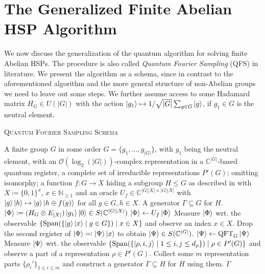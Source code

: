 \documentclass[10pt]{amsart}
\theoremstyle{definition}
\theoremstyle{remark}
\DeclareMathOperator{\Span}{Span}
\newcommand{\onot}{\mathcal{O}}
\begin{document}
    \section{The Generalized Finite Abelian HSP Algorithm} \phantom{}

    We now discuss the generalization of the quantum algorithm for solving finite Abelian HSPs. The procedure is also called \emph{Quantum Fourier Sampling} (QFS) in literature. We present the algorithm as a schema, since in contrast to the aforementioned algorithm and the more general structure of non-Abelian groups we need to leave out some steps. We further assume access to some Hadamard matrix \(H_G \in U(|G|)\) with the action \(\ket{g_1} \mapsto 1/\sqrt{|G|} \sum_{g \in G} \ket{g}\), if \(g_1 \in G\) is the neutral element.

    {\centering\begin{minipage}{\linewidth}
        \vspace{-0.25cm}
        \begin{algorithm}[H]
            \caption{\textsc{Quantum Fourier Sampling Schema}}
            \label{quantum_fourier_sampling_schema}
            \begin{algorithmic}[1]
                \Require A finite group \(G\) in some order \(G = \{g_1, ..., g_{|G|}\}\), with \(g_1\) being the neutral element, with an \(\onot(\log_2(|G|))\)-complex representation in a \(\mathbb{C}^{|G|}\)-based quantum register, a complete set of irreducible representations \(P'(G)\); omitting isomorphy; a function \(f\colon G \to X\) hiding a subgroup \(H \leq G\) as described in  with \(X \coloneqq \{0, 1\}^x\), \(x \in \mathbb{N}_{\geq 1}\) and an oracle \(U_f \in \mathbb{C}^{|G||X| \times |G||X|}\) with \(\ket{g}\ket{h} \mapsto \ket{g}\ket{h \oplus f(g)}\) for all \(g \in G, h \in X\).
                \Ensure A generator \(\Gamma \subseteq G\) for \(H\).
                \State \(\ket{\Phi} \coloneqq (H_G \otimes E_{|X|}) \ket{g_1}\ket{0} \in S(\mathbb{C}^{|G||X|})\) \label{quantum_fourier_sampling_schema_step_1}
                \State \(\ket{\Phi} \gets U_f \ket{\Phi}\) \label{quantum_fourier_sampling_schema_step_2}
                \State Measure \(\ket{\Phi}\) wrt. the observable \(\{\Span(\{\ket{g}\ket{x} \mid g \in G\}) \mid x \in X\}\) and observe an index \(x \in X\).
                \State Drop the second register of \(\ket{\Phi} \eqqcolon \ket{\Psi}\ket{x}\) to obtain \(\ket{\Psi} \in S(\mathbb{C}^{|G|})\).
                \State \(\ket{\Psi} \gets \text{QFT}_G \ket{\Psi}\)
                \State Measure \(\ket{\Psi}\) wrt. the observable \(\{\Span(\{\ket{\rho, i, j} \mid 1 \leq i, j \leq d_\rho\}) \mid \rho \in P'(G)\}\) and observe a part of a representation \(\rho \in P'(G)\). \label{quantum_fourier_sampling_schema_step_6}
                \State Collect some \(m\) representation parts \(\{\rho_i'\}_{1 \leq i \leq m}\) and construct a generator \(\Gamma \subseteq H\) for \(H\) using them.
                \State \Return \(\Gamma\)
            \end{algorithmic}
        \end{algorithm}
    \end{minipage}\par} \phantom{}
\end{document}
